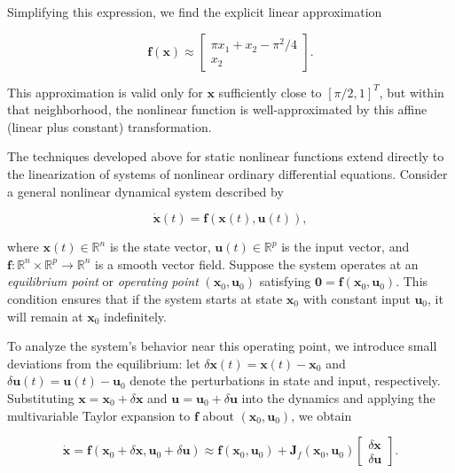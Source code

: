 \begin{example}
Simplifying this expression, we find the explicit linear approximation

\[
\mathbf{f}(\mathbf{x}) \approx \begin{bmatrix} \pi x_1 + x_2 - \pi^2/4 \\ x_2 \end{bmatrix}.
\]

This approximation is valid only for $\mathbf{x}$ sufficiently close to $[\pi/2, 1]^T$, but within that neighborhood, the nonlinear function is well-approximated by this affine (linear plus constant) transformation.
\end{example}

The techniques developed above for static nonlinear functions extend directly to the linearization of systems of nonlinear ordinary differential equations. Consider a general nonlinear dynamical system described by

\[
\dot{\mathbf{x}}(t) = \mathbf{f}(\mathbf{x}(t), \mathbf{u}(t)),
\]

where $\mathbf{x}(t) \in \mathbb{R}^n$ is the state vector, $\mathbf{u}(t) \in \mathbb{R}^p$ is the input vector, and $\mathbf{f}: \mathbb{R}^n \times \mathbb{R}^p \to \mathbb{R}^n$ is a smooth vector field. Suppose the system operates at an \emph{equilibrium point} or \emph{operating point} $(\mathbf{x}_0, \mathbf{u}_0)$ satisfying $\mathbf{0} = \mathbf{f}(\mathbf{x}_0, \mathbf{u}_0)$. This condition ensures that if the system starts at state $\mathbf{x}_0$ with constant input $\mathbf{u}_0$, it will remain at $\mathbf{x}_0$ indefinitely.

To analyze the system's behavior near this operating point, we introduce small deviations from the equilibrium: let $\delta\mathbf{x}(t) = \mathbf{x}(t) - \mathbf{x}_0$ and $\delta\mathbf{u}(t) = \mathbf{u}(t) - \mathbf{u}_0$ denote the perturbations in state and input, respectively. Substituting $\mathbf{x} = \mathbf{x}_0 + \delta\mathbf{x}$ and $\mathbf{u} = \mathbf{u}_0 + \delta\mathbf{u}$ into the dynamics and applying the multivariable Taylor expansion to $\mathbf{f}$ about $(\mathbf{x}_0, \mathbf{u}_0)$, we obtain

\[
\dot{\mathbf{x}} = \mathbf{f}(\mathbf{x}_0 + \delta\mathbf{x}, \mathbf{u}_0 + \delta\mathbf{u}) \approx \mathbf{f}(\mathbf{x}_0, \mathbf{u}_0) + \mathbf{J}_f(\mathbf{x}_0, \mathbf{u}_0) \begin{bmatrix} \delta\mathbf{x} \\ \delta\mathbf{u} \end{bmatrix}.
\]

